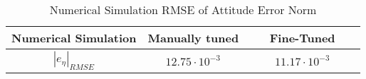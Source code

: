 \begin{table}[h!]
\centering
\caption{Numerical Simulation RMSE of Attitude Error Norm}
\label{table:RMSE_Sim}
\begin{tabular}{c|c|c}
\textbf{Numerical Simulation} & \textbf{ Manually tuned} & \textbf{\ \ \ Fine-Tuned\ \ \ } \\
\hline
$|e_{\eta}|_{RMSE}$ & $12.75\cdot 10^{-3} $ &  $11.17\cdot 10^{-3}$ 
\end{tabular}
\end{table}